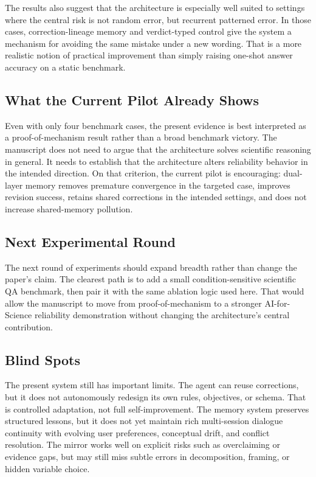 \documentclass[12pt]{article}
\begin{document}
The results also suggest that the architecture is especially well suited to settings where the central risk is not random error, but recurrent patterned error. In those cases, correction-lineage memory and verdict-typed control give the system a mechanism for avoiding the same mistake under a new wording. That is a more realistic notion of practical improvement than simply raising one-shot answer accuracy on a static benchmark.

\subsection{What the Current Pilot Already Shows}

Even with only four benchmark cases, the present evidence is best interpreted as a proof-of-mechanism result rather than a broad benchmark victory. The manuscript does not need to argue that the architecture solves scientific reasoning in general. It needs to establish that the architecture alters reliability behavior in the intended direction. On that criterion, the current pilot is encouraging: dual-layer memory removes premature convergence in the targeted case, improves revision success, retains shared corrections in the intended settings, and does not increase shared-memory pollution.

\subsection{Next Experimental Round}

The next round of experiments should expand breadth rather than change the paper's claim. The clearest path is to add a small condition-sensitive scientific QA benchmark, then pair it with the same ablation logic used here. That would allow the manuscript to move from proof-of-mechanism to a stronger AI-for-Science reliability demonstration without changing the architecture's central contribution.

\subsection{Blind Spots}

The present system still has important limits. The agent can reuse corrections, but it does not autonomously redesign its own rules, objectives, or schema. That is controlled adaptation, not full self-improvement. The memory system preserves structured lessons, but it does not yet maintain rich multi-session dialogue continuity with evolving user preferences, conceptual drift, and conflict resolution. The mirror works well on explicit risks such as overclaiming or evidence gaps, but may still miss subtle errors in decomposition, framing, or hidden variable choice.
\end{document}
